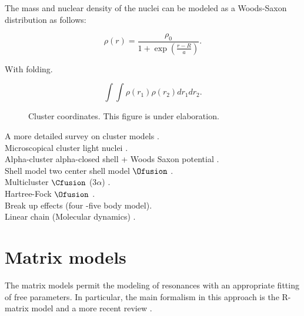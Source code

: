 \documentclass[openany]{book}
\begin{document}
The mass and nuclear density of the nuclei can be modeled as a Woods-Saxon distribution as follows:

\begin{equation} \label{eq:micro_density}
	\rho(r) = \frac{\rho_0}{1 + \exp{\left(\frac{r - R}{a}\right)}}.
\end{equation} 

With folding.

\begin{equation}  \label{eq:micro_folding}
	\int \int \rho(r_1) \rho(r_2) dr_1 dr_2. 
\end{equation}

\begin{figure}[H]
	
	\caption[Cluster coordinates]{Cluster coordinates. This figure is under elaboration.}
	\label{fig:clusterCoordinates}
\end{figure}

A more detailed survey on cluster models \cite{beck_2012}. \\

Microscopical cluster light nuclei \cite{freer_horiuchi_kanada-enyo_lee_meisner_2018}. \\

Alpha-cluster alpha-closed shell + Woods Saxon potential  \cite{bai_ren_2018}. \\

Shell model \cite{dong_wang_michel_ploszajczak_2022} two center shell model $\Ofusion$ \cite{tazawa_1974}. \\

Multicluster $\Cfusion$ (3$\alpha$) \cite{dufour_descouvemont_1997}. \\

Hartree-Fock $\Ofusion$ \cite{simenel_keser_umar_oberacker_2013}. \\

Break up effects (four -five body model)\cite{shubhchintak_descouvemont_2022}. \\

Linear chain (Molecular dynamics) \cite{baba_taniguchi_kimura_2022}. \\

\section{Matrix models}  \label{sec:matrixModels}

The matrix models permit the modeling of resonances with an appropriate fitting of free parameters. In particular, the main formalism in this approach is the R-matrix model \cite{lane_thomas_1958} and a more recent review \cite{descouvemont_baye_2010}. \\
\end{document}
